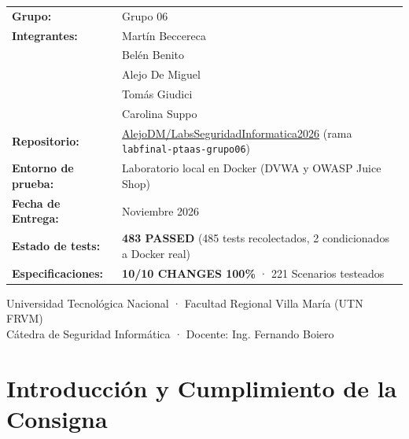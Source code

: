 \documentclass[10pt,a4paper]{article}
\newcommand{\badgepass}[1]{\colorbox{passbg}{\textcolor{passgreen}{\textbf{\scriptsize #1}}}}
\begin{document}
\begin{titlepage}
\begin{flushleft}
        \begin{tabularx}{\linewidth}{ll}
            \textbf{\color{darkslate} Grupo:} & Grupo 06 \\[6pt]
            \textbf{\color{darkslate} Integrantes:} & Martín Beccereca \\
                                                    & Belén Benito \\
                                                    & Alejo De Miguel \\
                                                    & Tomás Giudici \\
                                                    & Carolina Suppo \\[8pt]
            \textbf{\color{darkslate} Repositorio:} & \href{https://github.com/AlejoDM/LabsSeguridadInformatica2026}{AlejoDM/LabsSeguridadInformatica2026} (rama \texttt{labfinal-ptaas-grupo06}) \\[6pt]
            \textbf{\color{darkslate} Entorno de prueba:} & Laboratorio local en Docker (DVWA y OWASP Juice Shop) \\[6pt]
            \textbf{\color{darkslate} Fecha de Entrega:} & Noviembre 2026 \\[6pt]
            \textbf{\color{darkslate} Estado de tests:} & \badgepass{483 PASSED} (485 tests recolectados, 2 condicionados a Docker real) \\
            \textbf{\color{darkslate} Especificaciones:} & \badgepass{10/10 CHANGES 100\%} · 221 Scenarios testeados \\
        \end{tabularx}

        \vfill
        \begin{center}
            \small\color{mutedgray}
            Universidad Tecnológica Nacional · Facultad Regional Villa María (UTN FRVM) \\[3pt]
            Cátedra de Seguridad Informática · Docente: Ing. Fernando Boiero
        \end{center}
    \end{flushleft}
\end{titlepage}

\section{Introducción y Cumplimiento de la Consigna}
\end{document}
